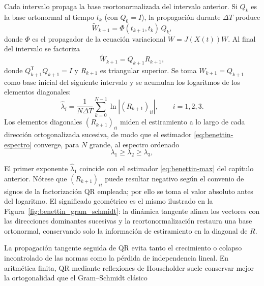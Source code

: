 \documentclass[12pt,a4paper,oneside]{report}
\theoremstyle{definition}
\numberwithin{equation}{chapter}
\newcommand{\abs}[1]{\left|#1\right|}
\newcommand{\trans}{\mathsf{T}}
\begin{document}
Cada intervalo propaga la base reortonormalizada del intervalo anterior.
Si \(Q_k\) es la base ortonormal al tiempo \(t_k\) (con \(Q_0=I\)),
la propagación durante \(\Delta T\) produce
\begin{equation}
    \widetilde W_{k+1} = \Phi(t_{k+1},t_k)\,Q_k,
    \label{eq:propaga-base}
\end{equation}
donde \(\Phi\) es el propagador de la ecuación variacional
\(\dot W=J(X(t))W\). Al final del intervalo se factoriza
\begin{equation}
    \widetilde W_{k+1}=Q_{k+1}R_{k+1},
\end{equation}
donde \(Q_{k+1}^{\trans}Q_{k+1}=I\) y \(R_{k+1}\) es triangular superior.
Se toma \(W_{k+1}=Q_{k+1}\) como base inicial del siguiente intervalo y
se acumulan los logaritmos de los elementos diagonales:
\begin{equation}
    \boxed{
    \widehat{\lambda}_i= \frac{1}{N\Delta T} \sum_{k=0}^{N-1}\ln\abs{(R_{k+1})_{ii}}, \qquad i=1,2,3.}
    \label{eq:benettin-espectro}
\end{equation}
Los elementos diagonales \((R_{k+1})_{ii}\) miden el estiramiento a lo
largo de cada dirección ortogonalizada sucesiva, de modo que el
estimador \eqref{eq:benettin-espectro} converge, para \(N\) grande, al
espectro ordenado
\begin{equation}
    \lambda_1 \ge \lambda_2 \ge \lambda_3,
\end{equation}

El primer exponente
\(\widehat{\lambda}_1\) coincide con el estimador
\eqref{eq:benettin-max} del capítulo anterior. Nótese que \((R_{k+1})_{ii}\) puede resultar negativo según el convenio
de signos de la factorización QR empleada; por ello se toma el valor
absoluto antes del logaritmo. El significado geométrico es el mismo
ilustrado en la Figura~\ref{fig:benettin_gram_schmidt}: la dinámica
tangente alinea los vectores con las direcciones dominantes sucesivas y
la reortonormalización restaura una base ortonormal, conservando solo la
información de estiramiento en la diagonal de \(R\).

La propagación tangente seguida de QR evita tanto el crecimiento o
colapso incontrolado de las normas como la pérdida de independencia
lineal. En aritmética finita, QR mediante reflexiones de Householder
suele conservar mejor la ortogonalidad que el Gram--Schmidt clásico \cite{gatica2026}
\end{document}
